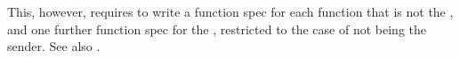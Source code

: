 This, however, requires to write a function spec for each function that is not the , and one further function spec for the , restricted to the case of  not being the sender. See also .



